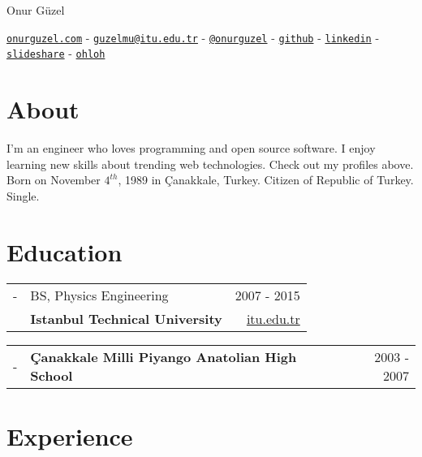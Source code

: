 \documentclass[11pt,a4paper]{article}
\author{\name}
\title{\cv}
\def\name{Onur Güzel}
\renewenvironment{itemize}{
  \begin{list}{}{
    \setlength{\leftmargin}{0em}
  }
}{
  \end{list}
}
\begin{document}

\begin{flushright}
\Huge \name
\end{flushright}

\begin{center}
\href{http://www.onurguzel.com/}{\tt onurguzel.com} - 
\href{mailto:guzelmu@itu.edu.tr}{\tt guzelmu@itu.edu.tr} - 
\href{http://onurguzel.com/twitter}{\tt @onurguzel} - 
\href{http://onurguzel.com/github}{\tt github} - 
\href{http://linkedin.com/in/guzelmu}{\tt linkedin} - 
\href{http://www.slideshare.net/onurguzel}{\tt slideshare} - 
\href{http://www.ohloh.net/accounts/onurguzel}{\tt ohloh}
\end{center}

\section*{About}
I'm an engineer who loves programming and open source software. I enjoy learning new skills about trending web technologies. Check out my profiles above.\\[10pt]
Born on November $4^{th}$, 1989 in Çanakkale, Turkey. Citizen of Republic of Turkey. Single.

\section*{Education}
\begin{itemize}
\item
\begin{tabularx}{\textwidth}{ l X r }
- & BS, Physics Engineering & 2007 - 2015 \\
& \textbf{Istanbul Technical University} & \href{http://www.itu.edu.tr/en/}{itu.edu.tr}
\end{tabularx}
\item
\begin{tabularx}{\textwidth}{l X r}
- & \textbf{Çanakkale Milli Piyango Anatolian High School} & 2003 - 2007
\end{tabularx}
\end{itemize}

\section*{Experience}
\end{document}

